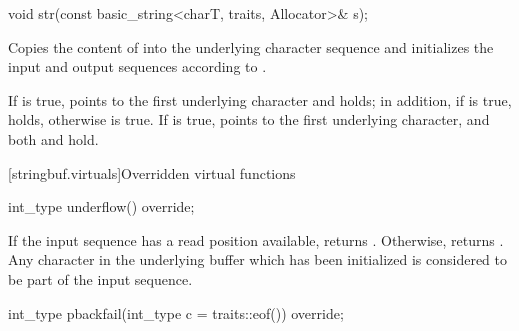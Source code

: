 %
\begin{itemdecl}
void str(const basic_string<charT, traits, Allocator>& s);
\end{itemdecl}

\begin{itemdescr}
\pnum
\effects
Copies the content of  into the  underlying character
sequence and initializes the input and output sequences according to .

\pnum
\postconditions If  is true,  points to the
first underlying character and   holds; in
addition, if  is true,
holds, otherwise  is true. If  is
true,  points to the first underlying character, and both  and  hold.
\end{itemdescr}

[stringbuf.virtuals]{Overridden virtual functions}

%
\begin{itemdecl}
int_type underflow() override;
\end{itemdecl}

\begin{itemdescr}
\pnum
\returns
If the input sequence has a read position available,
returns
.
Otherwise, returns
.
Any character in the underlying buffer which has been initialized is considered
to be part of the input sequence. 
\end{itemdescr}

%
\begin{itemdecl}
int_type pbackfail(int_type c = traits::eof()) override;
\end{itemdecl}

